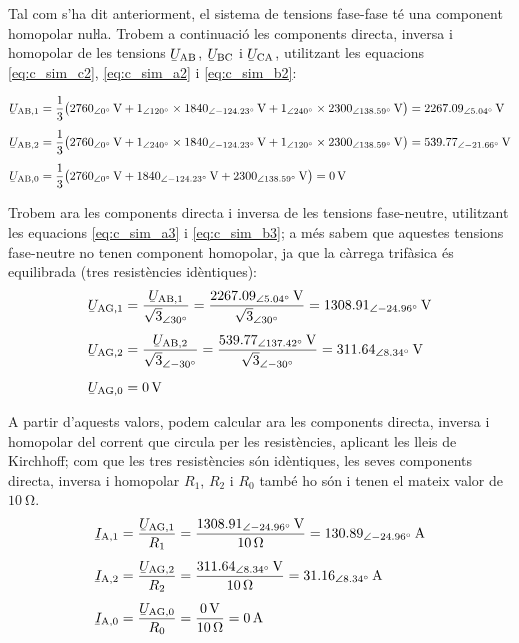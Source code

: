 \begin{exemple}
    Tal com s'ha dit anteriorment, el sistema de tensions fase-fase   té una component homopolar nuŀla.     Trobem a continuació les components directa, inversa i homopolar de les
    tensions $\cmplx{U}\ped{AB}$, $\cmplx{U}\ped{BC}$ i
    $\cmplx{U}\ped{CA}$, utilitzant les equacions
    \eqref{eq:c_sim_c2}, \eqref{eq:c_sim_a2} i \eqref{eq:c_sim_b2}:

    \begin{align*}
    \cmplx{U}\ped{AB,1} &= \frac{1}{3} \big(
    \qtypd{2760}{0}{V} + \numpd{1}{120} \times \qtypd{1840}{-124,23}{V} +
    \numpd{1}{240} \times \qtypd{2300}{138,59}{V}\big) = \qtypd{2267,09}{5,04}{V} \\[1ex]
    \cmplx{U}\ped{AB,2} &= \frac{1}{3} \big(
    \qtypd{2760}{0}{V} + \numpd{1}{240} \times \qtypd{1840}{-124,23}{V} +
    \numpd{1}{120} \times \qtypd{2300}{138,59}{V} \big) = \qtypd{539,77}{-21,66}{V} \\[1ex]
    \cmplx{U}\ped{AB,0} &= \frac{1}{3} \big(
    \qtypd{2760}{0}{V} + \qtypd{1840}{-124,23}{V} + \qtypd{2300}{138,59}{V}\big) = \qty{0}{V}
    \end{align*}

    Trobem ara les components directa i inversa
    de les tensions fase-neutre, utilitzant les equacions
    \eqref{eq:c_sim_a3} i \eqref{eq:c_sim_b3}; a més sabem que aquestes tensions fase-neutre no
    tenen component homopolar, ja que la càrrega trifàsica és equilibrada
    (tres resistències idèntiques):
    \begin{align*}
        \cmplx{U}\ped{AG,1} &=
        \frac{\cmplx{U}\ped{AB,1}}{\sqrt{3}_{\angle\ang{30}}} =
        \frac{\qtypd{2267,09}{5,04}{V}}{\sqrt{3}_{\angle\ang{30}}} =
        \qtypd{1308,91}{-24,96}{V} \\[1ex]
        \cmplx{U}\ped{AG,2} &=
        \frac{\cmplx{U}\ped{AB,2}}{\sqrt{3}_{\angle\ang{-30}}} =
        \frac{\qtypd{539,77}{137,42}{V}}{\sqrt{3}_{\angle\ang{-30}}} =
        \qtypd{311,64}{8,34}{V} \\[1ex]
        \cmplx{U}\ped{AG,0} &= \qty{0}{V}
    \end{align*}


    A partir d'aquests valors, podem calcular ara les components
    directa, inversa i homopolar del corrent que circula per les
    resistències, aplicant les lleis de Kirchhoff; com que les tres resistències són idèntiques, les seves  components    directa, inversa i homopolar $R_1$,  $R_2$ i $R_0$ també ho són i tenen el mateix valor de $\qty{10}{\ohm}$.
    \begin{align*}
    \cmplx{I}\ped{A,1} &=
    \frac{\cmplx{U}\ped{AG,1}}{R_1} =
    \frac{\qtypd{1308,91}{-24,96}{V}}{\qty{10}{\ohm}} =
    \qtypd{130,89}{-24,96}{A} \\[1ex]
    \cmplx{I}\ped{A,2} &=
    \frac{\cmplx{U}\ped{AG,2}}{R_2} =
    \frac{\qtypd{311,64}{8,34}{V}}{\qty{10}{\ohm}} =
    \qtypd{31,16}{8,34}{A} \\[1ex]
    \cmplx{I}\ped{A,0} &=
    \frac{\cmplx{U}\ped{AG,0}}{R_0} =
    \frac{\qty{0}{V}}{\qty{10}{\ohm}} =
    \qty{0}{A}
    \end{align*}


\end{exemple}
